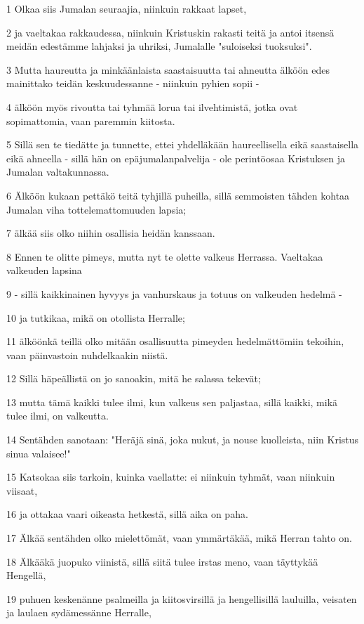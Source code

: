 \par 1 Olkaa siis Jumalan seuraajia, niinkuin rakkaat lapset,
\par 2 ja vaeltakaa rakkaudessa, niinkuin Kristuskin rakasti teitä ja antoi itsensä meidän edestämme lahjaksi ja uhriksi, Jumalalle "suloiseksi tuoksuksi".
\par 3 Mutta haureutta ja minkäänlaista saastaisuutta tai ahneutta älköön edes mainittako teidän keskuudessanne - niinkuin pyhien sopii -
\par 4 älköön myös rivoutta tai tyhmää lorua tai ilvehtimistä, jotka ovat sopimattomia, vaan paremmin kiitosta.
\par 5 Sillä sen te tiedätte ja tunnette, ettei yhdelläkään haureellisella eikä saastaisella eikä ahneella - sillä hän on epäjumalanpalvelija - ole perintöosaa Kristuksen ja Jumalan valtakunnassa.
\par 6 Älköön kukaan pettäkö teitä tyhjillä puheilla, sillä semmoisten tähden kohtaa Jumalan viha tottelemattomuuden lapsia;
\par 7 älkää siis olko niihin osallisia heidän kanssaan.
\par 8 Ennen te olitte pimeys, mutta nyt te olette valkeus Herrassa. Vaeltakaa valkeuden lapsina
\par 9 - sillä kaikkinainen hyvyys ja vanhurskaus ja totuus on valkeuden hedelmä -
\par 10 ja tutkikaa, mikä on otollista Herralle;
\par 11 älköönkä teillä olko mitään osallisuutta pimeyden hedelmättömiin tekoihin, vaan päinvastoin nuhdelkaakin niistä.
\par 12 Sillä häpeällistä on jo sanoakin, mitä he salassa tekevät;
\par 13 mutta tämä kaikki tulee ilmi, kun valkeus sen paljastaa, sillä kaikki, mikä tulee ilmi, on valkeutta.
\par 14 Sentähden sanotaan: "Heräjä sinä, joka nukut, ja nouse kuolleista, niin Kristus sinua valaisee!"
\par 15 Katsokaa siis tarkoin, kuinka vaellatte: ei niinkuin tyhmät, vaan niinkuin viisaat,
\par 16 ja ottakaa vaari oikeasta hetkestä, sillä aika on paha.
\par 17 Älkää sentähden olko mielettömät, vaan ymmärtäkää, mikä Herran tahto on.
\par 18 Älkääkä juopuko viinistä, sillä siitä tulee irstas meno, vaan täyttykää Hengellä,
\par 19 puhuen keskenänne psalmeilla ja kiitosvirsillä ja hengellisillä lauluilla, veisaten ja laulaen sydämessänne Herralle,
